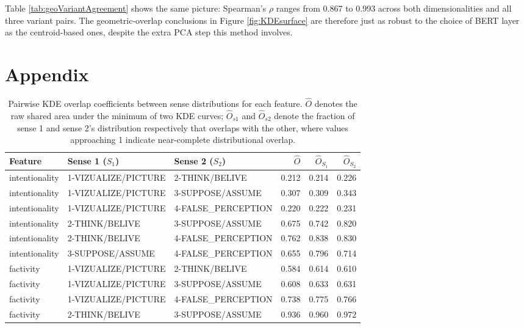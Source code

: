 \documentclass[
]{article}
\begin{document}
Table \ref{tab:geoVariantAgreement} shows the same picture: Spearman's
\(\rho\) ranges from 0.867 to 0.993 across both dimensionalities and all
three variant pairs. The geometric-overlap conclusions in Figure
\ref{fig:KDEsurface} are therefore just as robust to the choice of BERT
layer as the centroid-based ones, despite the extra PCA step this method
involves.

\pagebreak

\section{Appendix}\label{appendix}

\begin{landscape}\begin{table}[H]
\centering
\caption{\label{tab:unnamed-chunk-31}Pairwise KDE overlap coefficients between sense distributions for each feature. 
    $\hat{O}$ denotes the raw shared area under the minimum of two KDE curves; 
    $\hat{O}_{s1}$ and $\hat{O}_{s2}$ denote the fraction of sense 1 and sense 2's 
    distribution respectively that overlaps with the other, where values approaching 1 
    indicate near-complete distributional overlap.\label{tab:overlap}}
\centering
\fontsize{8}{10}\selectfont
\begin{tabular}[t]{lllrrr}
\toprule
Feature & Sense 1 ($S_1$) & Sense 2 ($S_2$) & $\hat{O}$ & $\hat{O}_{S_1}$ & $\hat{O}_{S_2}$\\
\midrule
intentionality & 1-VIZUALIZE/PICTURE & 2-THINK/BELIVE & 0.212 & 0.214 & 0.226\\
intentionality & 1-VIZUALIZE/PICTURE & 3-SUPPOSE/ASSUME & 0.307 & 0.309 & 0.343\\
intentionality & 1-VIZUALIZE/PICTURE & 4-FALSE\_PERCEPTION & 0.220 & 0.222 & 0.231\\
intentionality & 2-THINK/BELIVE & 3-SUPPOSE/ASSUME & 0.675 & 0.742 & 0.820\\
intentionality & 2-THINK/BELIVE & 4-FALSE\_PERCEPTION & 0.762 & 0.838 & 0.830\\
intentionality & 3-SUPPOSE/ASSUME & 4-FALSE\_PERCEPTION & 0.655 & 0.796 & 0.714\\
factivity & 1-VIZUALIZE/PICTURE & 2-THINK/BELIVE & 0.584 & 0.614 & 0.610\\
factivity & 1-VIZUALIZE/PICTURE & 3-SUPPOSE/ASSUME & 0.608 & 0.633 & 0.631\\
factivity & 1-VIZUALIZE/PICTURE & 4-FALSE\_PERCEPTION & 0.738 & 0.775 & 0.766\\
factivity & 2-THINK/BELIVE & 3-SUPPOSE/ASSUME & 0.936 & 0.960 & 0.972\\

\end{tabular}
\end{table}
\end{landscape}
\end{document}
